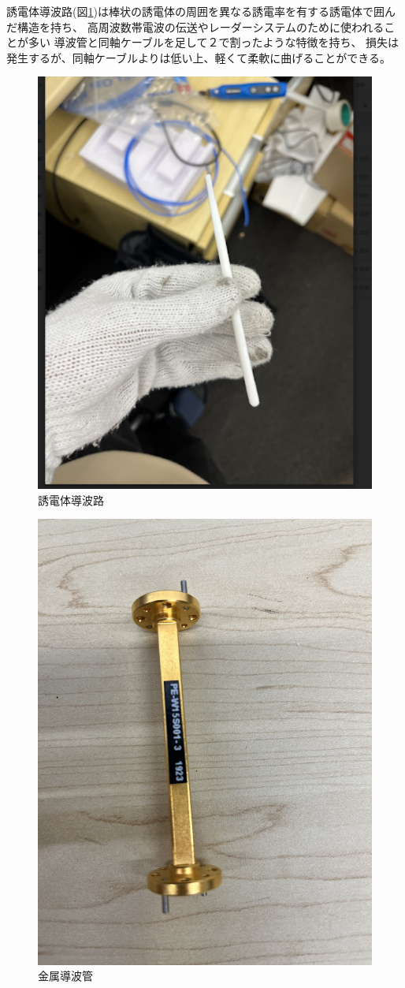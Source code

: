 \documentclass[technicalreport]{ieicej}
\begin{document}
誘電体導波路(図\ref{fig:dielectric_waveguide})は棒状の誘電体の周囲を異なる誘電率を有する誘電体で囲んだ構造を持ち、
高周波数帯電波の伝送やレーダーシステム\cite{4297420}のために使われることが多い
導波管と同軸ケーブルを足して２で割ったような特徴を持ち、
損失は発生するが、同軸ケーブルよりは低い上、軽くて柔軟に曲げることができる。


\begin{figure}[tb]
  \begin{center}
    \includegraphics[bb=0 0 311 384, width=0.5\linewidth]{img/waveguide.pdf}
    \caption{誘電体導波路}
    \label{fig:dielectric_waveguide}
  \end{center}
\end{figure}

\begin{figure}[tb]
  \begin{center}
    \includegraphics[bb=0.000000 0.000000 593.264305 791.019074, width=0.5\linewidth]{img/metallic_waveguide.pdf}
    \caption{金属導波管}
    \label{fig:metallic_waveguide}
  \end{center}
\end{figure}
\end{document}
